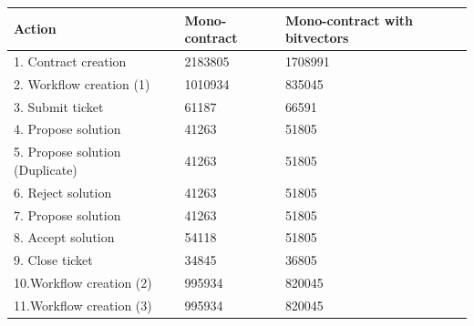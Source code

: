\documentclass{article}
\begin{document}
		\begin{tabular}{| l | l | l |}
			\hline
			Action 							& Mono-contract  & Mono-contract with bitvectors \\ \hline
			1. Contract creation			& 2183805		 & 1708991 	\\\hline
			2. Workflow creation (1)		& 1010934 		 & 835045 	\\\hline
			3. Submit ticket				& 61187			 & 66591	\\\hline
			4. Propose solution				& 41263 		 & 51805	\\\hline
			5. Propose solution (Duplicate)	& 41263 		 & 51805	\\\hline
			6. Reject solution				& 41263 		 & 51805	\\\hline
			7. Propose solution				& 41263 		 & 51805	\\\hline
			8. Accept solution				& 54118 		 & 51805	\\\hline
			9. Close ticket					& 34845 		 & 36805	\\\hline
			10.Workflow creation (2)		& 995934 		 & 820045	\\\hline
			11.Workflow creation (3)		& 995934 		 & 820045	\\\hline
			\hline
		\end{tabular}
		\pagebreak
\end{document}
